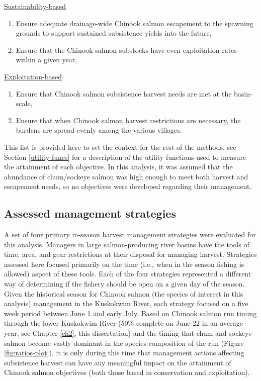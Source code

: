 \documentclass[12pt,]{book}
\theoremstyle{definition}
\theoremstyle{definition}
\theoremstyle{definition}
\theoremstyle{remark}
\begin{document}
\noindent
\underline{Sustainability-based}

\begin{enumerate}
\def\labelenumi{(\arabic{enumi})}
\item
  Ensure adequate drainage-wide Chinook salmon escapement to the
  spawning grounds to support sustained subsistence yields into the
  future,
\item
  Ensure that the Chinook salmon substocks have even exploitation rates
  within a given year,
\end{enumerate}

\noindent
\underline{Exploitation-based}

\begin{enumerate}
\def\labelenumi{(\arabic{enumi})}
\setcounter{enumi}{2}
\item
  Ensure that Chinook salmon subsistence harvest needs are met at the
  basin-scale,
\item
  Ensure that when Chinook salmon harvest restrictions are necessary,
  the burdens are spread evenly among the various villages.
\end{enumerate}

\noindent
This list is provided here to set the context for the rest of the
methods, see Section \ref{utility-funcs} for a description of the
utility functions used to measure the attainment of each objective. In
this analysis, it was assumed that the abundance of chum/sockeye salmon
was high enough to meet both harvest and escapement needs, so no
objectives were developed regarding their management.

\subsection{Assessed management strategies}\label{strategies}

\noindent
A set of four primary in-season harvest management strategies were
evaluated for this analysis. Managers in large salmon-producing river
basins have the tools of time, area, and gear restrictions at their
disposal for managing harvest. Strategies assessed here focused
primarily on the time (i.e., when in the season fishing is allowed)
aspect of these tools. Each of the four strategies represented a
different way of determining if the fishery should be open on a given
day of the season. Given the historical season for Chinook salmon (the
species of interest in this analysis) management in the Kuskokwim River,
each strategy focused on a five week period between June 1 and early
July. Based on Chinook salmon run timing through the lower Kuskokwim
River (50\% complete on June 22 in an average year, see Chapter
\ref{ch2}, this dissertation) and the timing that chum and sockeye
salmon become vastly dominant in the species composition of the run
(Figure \ref{fig:ratios-plot}), it is only during this time that
management actions affecting subsistence harvest can have any meaningful
impact on the attainment of Chinook salmon objectives (both those based
in conservation and exploitation).
\end{document}

